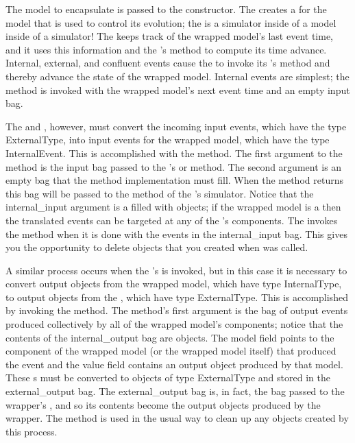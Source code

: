 The model to encapsulate is passed to the  constructor. The  creates a  for the model that is used to control its evolution; the  is a simulator inside of a model inside of a simulator! The  keeps track of the wrapped model's last event time, and it uses this information and the 's  method to compute its time advance. Internal, external, and confluent events cause the  to invoke its 's  method and thereby advance the state of the wrapped model. Internal events are simplest; the  method is invoked with the wrapped model's next event time and an empty input bag. 

The  and , however, must convert the incoming input events, which have the type ExternalType, into input events for the wrapped model, which have the type InternalEvent. This is accomplished with the  method. The first argument to the method is the input bag passed to the 's  or  method. The second argument is an empty bag that the method implementation must fill. When the  method returns this bag will be passed to the  method of the 's simulator. Notice that the internal\_input argument is a  filled with  objects; if the wrapped model is a  then the translated events can be targeted at any of the 's components. The  invokes the  method when it is done with the events in the internal\_input bag. This gives you the opportunity to delete objects that you created when  was called.

A similar process occurs when the 's  is invoked, but in this case it is necessary to convert output objects from the wrapped model, which have type InternalType, to output objects from the , which have type ExternalType. This is accomplished by invoking the  method. The method's first argument is the bag of output events produced collectively by all of the wrapped model's components; notice that the contents of the internal\_output bag are  objects. The model field points to the component of the wrapped model (or the wrapped model itself) that produced the event and the value field contains an output object produced by that model. These s must be converted to objects of type ExternalType and stored in the external\_output bag. The external\_output bag is, in fact, the bag passed to the wrapper's , and so its contents become the output objects produced by the wrapper. The  method is used in the usual way to clean up any objects created by this process.

